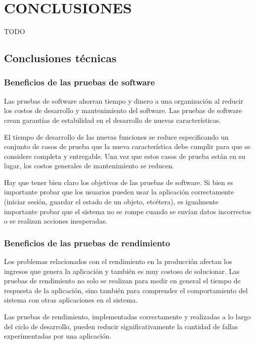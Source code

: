 \chapter{CONCLUSIONES\label{sec:conclusiones}}

TODO

\clearpage

\section{Conclusiones técnicas}

\subsection{Beneficios de las pruebas de software}

Las pruebas de software ahorran tiempo y dinero a una organización al reducir los costos de desarrollo y mantenimiento del software. Las pruebas de software crean garantías de estabilidad en el desarrollo de nuevas características.

El tiempo de desarrollo de las nuevas funciones se reduce especificando un conjunto de casos de prueba que la nueva característica debe cumplir para que se considere completa y entregable. Una vez que estos casos de prueba están en su lugar, los costos generales de mantenimiento se reducen.

Hay que tener bien claro los objetivos de las pruebas de software. Si bien es importante probar que los usuarios pueden usar la aplicación correctamente (iniciar sesión, guardar el estado de un objeto, etcétera), es igualmente importante probar que el sistema no se rompe cuando se envían datos incorrectos o se realizan acciones inesperadas.

\subsection{Beneficios de las pruebas de rendimiento}

Los problemas relacionados con el rendimiento en la producción afectan los ingresos que genera la aplicación y también es muy costoso de solucionar. Las pruebas de rendimiento no solo se realizan para medir en general el tiempo de respuesta de la aplicación, sino también para comprender el comportamiento del sistema con otras aplicaciones en el sistema.

Las pruebas de rendimiento, implementadas correctamente y realizadas a lo largo del ciclo de desarrollo, pueden reducir significativamente la cantidad de fallas experimentadas por una aplicación.


